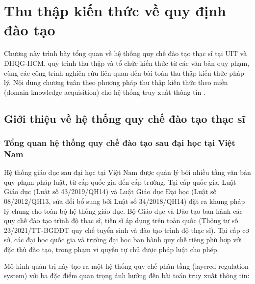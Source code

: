 \chapter{Thu thập kiến thức về quy định đào tạo}
\label{chap:chapter2}

Chương này trình bày tổng quan về hệ thống quy chế đào tạo thạc sĩ tại UIT và
ĐHQG-HCM, quy trình thu thập và tổ chức kiến thức từ các văn bản quy phạm, cùng
các công trình nghiên cứu liên quan đến bài toán thu thập kiến thức pháp lý.
Nội dung chương tuân theo phương pháp thu thập kiến thức theo miền (domain knowledge
acquisition) cho hệ thống truy xuất thông tin \cite{sartor2011legalonto}.

\section{Giới thiệu về hệ thống quy chế đào tạo thạc sĩ}
\label{sec:gioithieu_quyche}

\subsection{Tổng quan hệ thống quy chế đào tạo sau đại học tại Việt Nam}
\label{subsec:tongquan_hethong}

Hệ thống giáo dục sau đại học tại Việt Nam được quản lý bởi nhiều tầng văn bản quy
phạm pháp luật, từ cấp quốc gia đến cấp trường. Tại cấp quốc gia, Luật Giáo dục
(Luật số 43/2019/QH14) và Luật Giáo dục Đại học (Luật số 08/2012/QH13, sửa đổi bổ
sung bởi Luật số 34/2018/QH14) đặt ra khung pháp lý chung cho toàn bộ hệ thống giáo
dục. Bộ Giáo dục và Đào tạo ban hành các quy chế đào tạo trình độ thạc sĩ, tiến sĩ
áp dụng trên toàn quốc (Thông tư số 23/2021/TT-BGDĐT quy chế tuyển sinh và đào tạo
trình độ thạc sĩ). Tại cấp cơ sở, các đại học quốc gia và trường đại học ban hành
quy chế riêng phù hợp với đặc thù đào tạo, trong phạm vi quyền tự chủ được pháp
luật cho phép.

Mô hình quản trị này tạo ra một hệ thống quy chế phân tầng (layered regulation
system) với ba đặc điểm quan trọng ảnh hưởng đến bài toán truy xuất thông tin:

